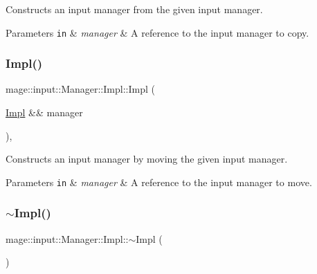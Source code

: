 Constructs an input manager from the given input manager.


\begin{DoxyParams}[1]{Parameters}
\mbox{\tt in}  & {\em manager} & A reference to the input manager to copy. \\
\hline
\end{DoxyParams}
\mbox{\label{classmage_1_1input_1_1_manager_1_1_impl_a15372813362704488fc264aa5d784b0e}} 
\subsubsection{\texorpdfstring{Impl()}{Impl()}\hspace{0.1cm}{\footnotesize\ttfamily [3/3]}}
{\footnotesize\ttfamily mage\+::input\+::\+Manager\+::\+Impl\+::\+Impl (\begin{DoxyParamCaption}\item[{\mbox{\hyperlink{classmage_1_1input_1_1_manager_1_1_impl}{Impl}} \&\&}]{manager }\end{DoxyParamCaption})\hspace{0.3cm}{\ttfamily [default]}, {\ttfamily [noexcept]}}

Constructs an input manager by moving the given input manager.


\begin{DoxyParams}[1]{Parameters}
\mbox{\tt in}  & {\em manager} & A reference to the input manager to move. \\
\hline
\end{DoxyParams}
\mbox{\label{classmage_1_1input_1_1_manager_1_1_impl_ac8699aba365e2b08ea6564f8b63b6ae0}} 
\subsubsection{\texorpdfstring{$\sim$\+Impl()}{~Impl()}}
{\footnotesize\ttfamily mage\+::input\+::\+Manager\+::\+Impl\+::$\sim$\+Impl (\begin{DoxyParamCaption}{ }\end{DoxyParamCaption})\hspace{0.3cm}{\ttfamily [default]}}

